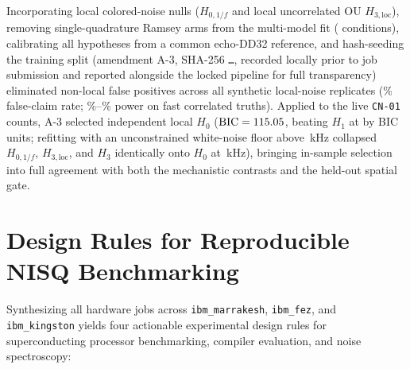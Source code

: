 \documentclass[twocolumn,aps,prapplied,superscriptaddress,floatfix]{revtex4-2}
\begin{document}
Incorporating local colored-noise nulls ($H_{0,1/f}$ and local uncorrelated OU $H_{3,\mathrm{loc}}$), removing single-quadrature Ramsey arms from the multi-model fit (\CnAThreeConds{} conditions), calibrating all hypotheses from a common echo-DD32 reference, and hash-seeding the training split (amendment A-3, SHA-256 \texttt{\CnAmendShaPrefix\ldots}, recorded locally prior to job submission and reported alongside the locked pipeline for full transparency) eliminated non-local false positives across all \CnValLocalNullReps{} synthetic local-noise replicates (\CnValAThreeLocalFpPct\% false-claim rate; \CnValAThreeFastPowPct\%--\CnValAThreeMarkovPowPct\% power on fast correlated truths). Applied to the live \texttt{CN-01} counts, A-3 selected independent local $H_0$ ($\mathrm{BIC} = 115.05$, beating $H_1$ at \CnAThreeBicHOne{} by \CnAThreeRunnerUpGap{} BIC units; refitting with an unconstrained white-noise floor above \CnWhiteFloorCapKhz\,kHz collapsed $H_{0,1/f}$, $H_{3,\mathrm{loc}}$, and $H_3$ identically onto $H_0$ at \CnSolvedWhiteFloorKhz\,kHz), bringing in-sample selection into full agreement with both the mechanistic contrasts and the held-out spatial gate.

\section{Design Rules for Reproducible NISQ Benchmarking}\label{sec:rules}

Synthesizing all \TotalJobs{} hardware jobs across \texttt{ibm\_marrakesh}, \texttt{ibm\_fez}, and \texttt{ibm\_kingston} yields four actionable experimental design rules for superconducting processor benchmarking, compiler evaluation, and noise spectroscopy:
\end{document}
